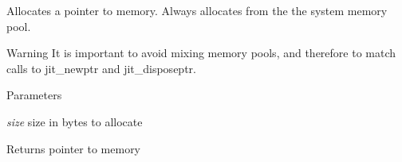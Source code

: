 Allocates a pointer to memory. Always allocates from the the system memory pool.

\begin{DoxyWarning}{Warning}
It is important to avoid mixing memory pools, and therefore to match calls to jit\_\-newptr and jit\_\-disposeptr.
\end{DoxyWarning}

\begin{DoxyParams}{Parameters}
\item[{\em size}]size in bytes to allocate\end{DoxyParams}
\begin{DoxyReturn}{Returns}
pointer to memory 
\end{DoxyReturn}
